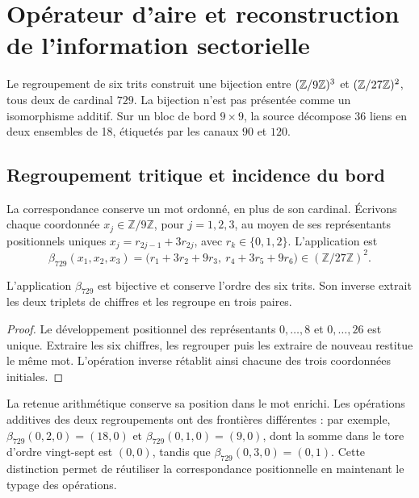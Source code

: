 \section{Opérateur d'aire et reconstruction de l'information sectorielle}
\label{sec:area}
Le regroupement de six trits construit une bijection entre
$(\mathbb Z/9\mathbb Z)^3$ et $(\mathbb Z/27\mathbb Z)^2$, tous deux de cardinal $729$.
La bijection n'est pas présentée comme un isomorphisme additif. Sur un bloc
de bord $9\times9$, la source décompose 36 liens en deux
ensembles de 18, étiquetés par les canaux $90$ et $120$.

\subsection{Regroupement tritique et incidence du bord}
\label{sec:ii-area-incidencia-explicita}

La correspondance conserve un mot ordonné, en plus de son cardinal.
Écrivons chaque coordonnée \(x_j\in\mathbb Z/9\mathbb Z\), pour
\(j=1,2,3\), au moyen de ses représentants positionnels uniques
\(x_j=r_{2j-1}+3r_{2j}\), avec \(r_k\in\{0,1,2\}\). L'application est
\begin{equation}
 \beta_{729}(x_1,x_2,x_3)
 =\bigl(r_1+3r_2+9r_3,\ r_4+3r_5+9r_6\bigr)
 \in(\mathbb Z/27\mathbb Z)^2.
 \label{eq:ii-area-beta729}
\end{equation}

\begin{proposition}
\label{prop:ii-area-beta729}
L'application \(\beta_{729}\) est bijective et conserve l'ordre des
six trits. Son inverse extrait les deux triplets de chiffres et les regroupe
en trois paires.
\end{proposition}
\begin{proof}
Le développement positionnel des représentants \(0,\ldots,8\) et
\(0,\ldots,26\) est unique. Extraire les six chiffres, les regrouper puis
les extraire de nouveau restitue le même mot. L'opération inverse
rétablit ainsi chacune des trois coordonnées initiales.
\end{proof}

La retenue arithmétique conserve sa position dans le mot enrichi. Les opérations
additives des deux regroupements ont des frontières différentes : par exemple,
\(\beta_{729}(0,2,0)=(18,0)\) et
\(\beta_{729}(0,1,0)=(9,0)\), dont la somme dans le tore d'ordre
vingt-sept est \((0,0)\), tandis que
\(\beta_{729}(0,3,0)=(0,1)\). Cette distinction permet de réutiliser
la correspondance positionnelle en maintenant le typage des opérations.

